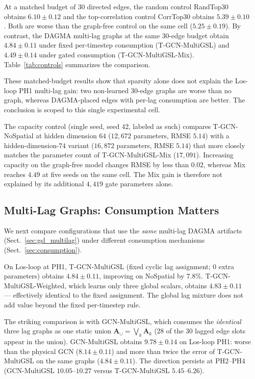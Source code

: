 At a matched budget of $30$ directed edges, the random control RandTop30
obtains $6.10\pm 0.12$ and the top-correlation control CorrTop30 obtains
$5.39\pm 0.10$. Both are worse than the graph-free control on the same cell
($5.25\pm 0.19$). By contrast, the DAGMA multi-lag graphs at the same
$30$-edge budget obtain $4.84\pm 0.11$ under fixed per-timestep consumption
(T-GCN-MultiGSL) and $4.49\pm 0.14$ under gated consumption
(T-GCN-MultiGSL-Mix). Table~\ref{tab:controls} summarizes the comparison.

These matched-budget results show that sparsity alone does not explain the
Los-loop PH1 multi-lag gain: two non-learned $30$-edge graphs are worse than
no graph, whereas DAGMA-placed edges with per-lag consumption are better.
The conclusion is scoped to this single experimental cell.

The capacity control (single seed, seed 42, labeled as such) compares
T-GCN-NoSpatial at hidden dimension $64$ ($12{,}672$ parameters,
RMSE $5.14$) with a hidden-dimension-$74$ variant
($16{,}872$ parameters, RMSE $5.14$) that more closely matches the parameter
count of T-GCN-MultiGSL-Mix ($17{,}091$). Increasing capacity on the
graph-free model changes RMSE by less than $0.02$, whereas Mix reaches
$4.49$ at five seeds on the same cell. The Mix gain is therefore not
explained by its additional $4{,}419$ gate parameters alone.

\subsection{Multi-Lag Graphs: Consumption Matters}\label{sec:res-dissociation}

We next compare configurations that use the \emph{same} multi-lag DAGMA
artifacts (Sect.~\ref{sec:gsl_multilag}) under different consumption
mechanisms (Sect.~\ref{sec:consumption}).

On Los-loop at PH1, T-GCN-MultiGSL (fixed cyclic lag assignment; $0$ extra
parameters) obtains $4.84\pm 0.11$, improving on NoSpatial by $7.8\%$.
T-GCN-MultiGSL-Weighted, which learns only three global scalars, obtains
$4.83\pm 0.11$ --- effectively identical to the fixed assignment. The global
lag mixture does not add value beyond the fixed per-timestep rule.

The striking comparison is with GCN-MultiGSL, which consumes the
\emph{identical} three lag graphs as one static union
$\mathbf{A}_{\cup}=\bigvee_k\mathbf{A}_k$ ($28$ of the $30$ lagged edge
slots appear in the union). GCN-MultiGSL obtains $9.78\pm 0.14$ on Los-loop
PH1: worse than the physical GCN ($8.14\pm 0.11$) and more than twice the
error of T-GCN-MultiGSL on the same graphs ($4.84\pm 0.11$). The direction
persists at PH2--PH4 (GCN-MultiGSL $10.05$--$10.27$ versus T-GCN-MultiGSL
$5.45$--$6.26$).

